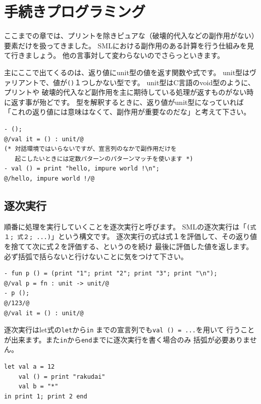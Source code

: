 \documentclass[11pt,a4paper]{article}
\begin{document}
\section{手続きプログラミング}

ここまでの章では、プリントを除きピュアな（破壊的代入などの副作用がない）要素だけを扱ってきました。
SMLにおける副作用のある計算を行う仕組みを見て行きましょう。
他の言事対して変わらないのでさらっといきます。

主にここで出てくるのは、返り値にunit型の値を返す関数や式です。
unit型はヴァリアントで、値が\lstinline{()}１つしかない型です。
unit型はC言語のvoid型のように、プリントや
破壊的代入など副作用を主に期待している処理が返すものがない時に返す事が殆どです。
型を解釈するときに、返り値がunit型になっていれば
「これの返り値には意味はなくて、副作用が重要なのだな」と考えて下さい。

\begin{lstlisting}
- ();
@/val it = () : unit/@
(* 対話環境ではいらないですが、宣言列のなかで副作用だけを
   起こしたいときには定数パターンのパターンマッチを使います *)
- val () = print "hello, impure world !\n";
@/hello, impure world !/@
\end{lstlisting}

\subsection{逐次実行}

順番に処理を実行していくことを逐次実行と呼びます。
SMLの逐次実行は「\lstinline{(式１; 式２; ...)}」という構文です。
逐次実行の式は式１を評価して、その返り値を捨てて次に式２を評価する、というのを続け
最後に評価した値を返します。必ず括弧で括らないと行けないことに気をつけて下さい。

\begin{lstlisting}[caption=逐次実行,label=code:sequence]
- fun p () = (print "1"; print "2"; print "3"; print "\n");
@/val p = fn : unit -> unit/@
- p ();
@/123/@
@/val it = () : unit/@
\end{lstlisting}

逐次実行はlet式の\lstinline{let}から\lstinline{in}
までの宣言列でも\lstinline{val () = ...}を用いて
行うことが出来ます。また\lstinline{in}から\lstinline{end}までに逐次実行を書く場合のみ
括弧が必要ありません。

\begin{lstlisting}
let val a = 12
    val () = print "rakudai"
    val b = "*"
in print 1; print 2 end
\end{lstlisting}
\end{document}
